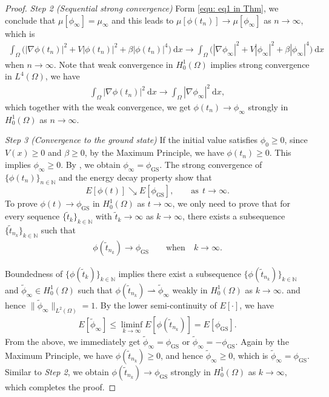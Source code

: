 \documentclass{siamart250211}
\begin{document}
\begin{proof}
\textit{Step 2 (Sequential strong convergence)} Form \eqref{equ: eq1 in Thm}, we conclude that $\mu[\phi_{\infty}] = \mu_{\infty}$ and this leads to $\mu[\phi(t_n)] \to \mu[\phi_{\infty}]$ as $n \to \infty$, which is 
\begin{align*}
    \int_{\Omega} \Big( |\nabla\phi(t_n)|^2 + V|\phi(t_n)|^2 + \beta |\phi(t_n)|^4 \Big) \ \text{d}x \to \int_{\Omega} \Big( |\nabla\phi_{\infty}|^2 + V|\phi_{\infty}|^2 + \beta |\phi_{\infty}|^4 \Big) \ \text{d}x
\end{align*}
when $n \to \infty$. Note that weak convergence in $H_0^1(\Omega)$ implies strong convergence in $L^4(\Omega)$, we have 
\begin{align*}
    \int_{\Omega} |\nabla\phi(t_n)|^2  \ \text{d}x \to \int_{\Omega} |\nabla\phi_{\infty}|^2  \ \text{d}x,
\end{align*}
which together with the weak convergence, we get $\phi(t_n) \to \phi_{\infty}$ strongly in $H_0^1(\Omega)$ as $n \to \infty$.

\textit{Step 3 (Convergence to the ground state)} If the initial value satisfies $\phi_0 \ge 0$, since $V(x) \ge 0$ and $\beta \ge 0$, by the Maximum Principle, we have $\phi(t_n) \ge 0$. This implies $\phi_{\infty} \ge 0$. By \cite[Lemma 5.3]{henning2020sobolev}, we obtain $\phi_{\infty} = \phi_{\text{GS}}$. The strong convergence of $\{\phi(t_n)\}_{n \in \mathbb{N}}$ and the energy decay property show that 
\begin{equation*}
    E[\phi(t)]\searrow  E[\phi_{\text{GS}}],\qquad \text{as}\ \ t\to\infty.
\end{equation*}
To prove $\phi(t) \to \phi_{\text{GS}}$ in $H_0^1(\Omega)$ as $t \to \infty$, we only need to prove that for every sequence $\{ \tilde{t}_k \}_{k \in \mathbb{N}}$ with $\tilde{t}_k \to \infty$ as $k \to \infty$, there exists a subsequence $\{ \tilde{t}_{n_k} \}_{k \in \mathbb{N}}$ such that 
\begin{align}
    \phi(\tilde{t}_{n_k}) \to \phi_{\text{GS}} \qquad \text{when} \quad k \to \infty.
\end{align}

Boundedness of $\{ \phi(\tilde{t}_k) \}_{k \in \mathbb{N}}$ implies there exist a subsequence $\{ \phi(\tilde{t}_{n_k}) \}_{k \in \mathbb{N}}$ and $\tilde{\phi}_{\infty} \in H_0^1(\Omega)$ such that $\phi(\tilde{t}_{n_k}) \rightharpoonup \tilde{\phi}_{\infty}$ weakly in $H_0^1(\Omega)$ as $k \to \infty$. and hence $\|\tilde{\phi}_{\infty}\|_{L^2(\Omega)} = 1$. By the lower semi-continuity of $E[\cdot]$, we have 
\begin{align*}
    E[\tilde{\phi}_{\infty}] \le \liminf_{k \to \infty} E[\phi(\tilde{t}_{n_k})] = E[\phi_{\text{GS}}].
\end{align*}
From the above, we immediately get $\tilde{\phi}_{\infty} = \phi_{\text{GS}}$ or $\tilde{\phi}_{\infty} = -\phi_{\text{GS}}$. Again by the Maximum Principle, we have $\phi(\tilde{t}_{n_k}) \ge 0$, and hence $\tilde{\phi}_{\infty} \ge 0$, which is $\tilde{\phi}_{\infty} = \phi_{\text{GS}}$. Similar to \textit{Step 2}, we obtain $\phi(\tilde{t}_{n_k}) \to \phi_{\text{GS}}$ strongly in $H_0^1(\Omega)$ as $k \to \infty$, which completes the proof.
\end{proof}
\end{document}
